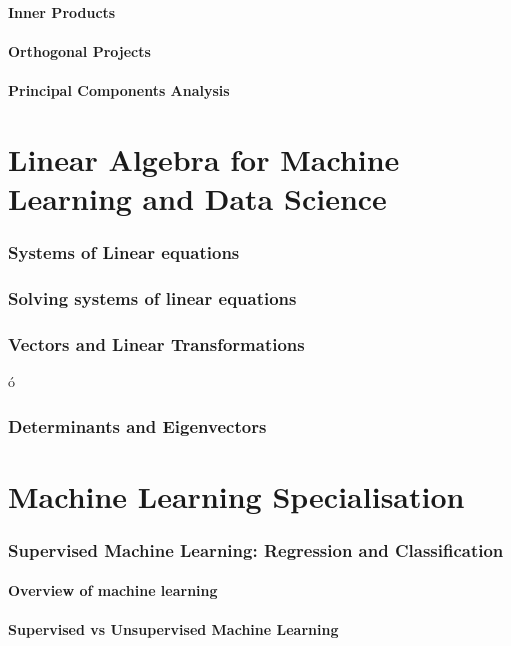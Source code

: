 \documentclass[a4paper, 11pt]{book}
\begin{document}
    \subsection{Inner Products}
    \subsection{Orthogonal Projects}
    \subsection{Principal Components Analysis}

    \part{Linear Algebra for Machine Learning and Data Science}
    \section{Systems of Linear equations}
    \section{Solving systems of linear equations}
    \section{Vectors and Linear Transformations}ó
    \section{Determinants and Eigenvectors}

    \part{Machine Learning Specialisation}

    \section{Supervised Machine Learning: Regression and Classification}
    \subsection{Overview of machine learning}
    \subsection{Supervised vs Unsupervised Machine Learning}
\end{document}
